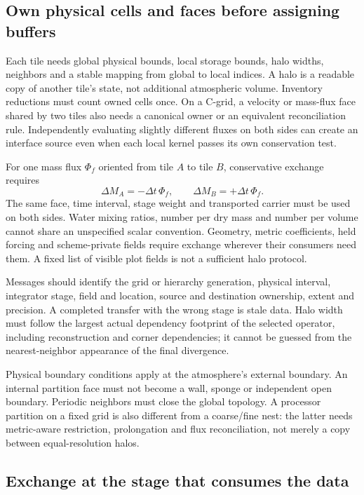 

\subsection{Own physical cells and faces before assigning buffers}

Each tile needs global physical bounds, local storage bounds, halo widths,
neighbors and a stable mapping from global to local indices. A halo is a
readable copy of another tile's state, not additional atmospheric volume.
Inventory reductions must count owned cells once. On a C-grid, a velocity or
mass-flux face shared by two tiles also needs a canonical owner or an equivalent
reconciliation rule. Independently evaluating slightly different fluxes on
both sides can create an interface source even when each local kernel passes
its own conservation test.

For one mass flux $\Phi_f$ oriented from tile $A$ to tile $B$, conservative
exchange requires
\[
 \Delta M_A=-\Delta t\,\Phi_f,\qquad
 \Delta M_B=+\Delta t\,\Phi_f.
\]
The same face, time interval, stage weight and transported carrier must be used
on both sides. Water mixing ratios, number per dry mass and number per volume
cannot share an unspecified scalar convention. Geometry, metric coefficients,
held forcing and scheme-private fields require exchange wherever their
consumers need them. A fixed list of visible plot fields is not a sufficient
halo protocol.

Messages should identify the grid or hierarchy generation, physical interval,
integrator stage, field and location, source and destination ownership, extent
and precision. A completed transfer with the wrong stage is stale data. Halo
width must follow the largest actual dependency footprint of the selected
operator, including reconstruction and corner dependencies; it cannot be
guessed from the nearest-neighbor appearance of the final divergence.

Physical boundary conditions apply at the atmosphere's external boundary.
An internal partition face must not become a wall, sponge or independent open
boundary. Periodic neighbors must close the global topology. A processor
partition on a fixed grid is also different from a coarse/fine nest: the
latter needs metric-aware restriction, prolongation and flux reconciliation,
not merely a copy between equal-resolution halos.

\subsection{Exchange at the stage that consumes the data}

